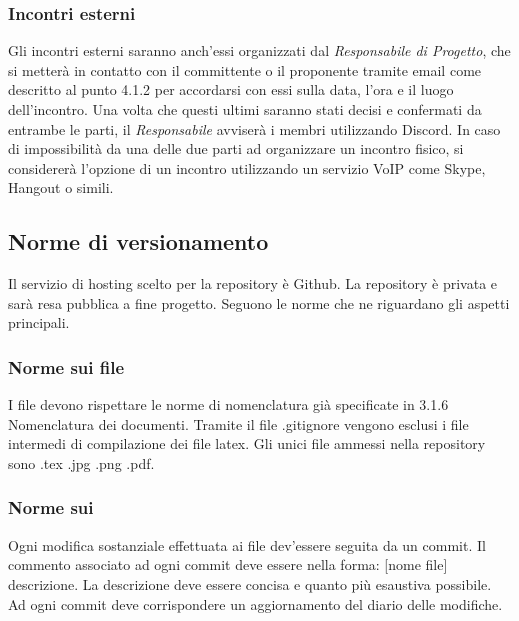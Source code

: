 \subsubsection{Incontri esterni}
Gli incontri esterni saranno anch'essi organizzati dal \emph{Responsabile di Progetto}, che si metterà in contatto con il committente o il proponente tramite email come descritto al punto 4.1.2 per accordarsi con essi sulla data, l'ora e il luogo dell'incontro. Una volta che questi ultimi saranno stati decisi e confermati da entrambe le parti, il \emph{Responsabile} avviserà i membri utilizzando Discord.
In caso di impossibilità da una delle due parti ad organizzare un incontro fisico, si considererà l'opzione di un incontro utilizzando un servizio VoIP come Skype, Hangout o simili.

\subsection{Norme di versionamento}
Il servizio di hosting scelto per la repository è Github. La repository è
privata e sarà resa pubblica a fine progetto. Seguono le norme che ne riguardano gli aspetti
principali.
\subsubsection{Norme sui file}
I file devono rispettare le norme di nomenclatura già specificate in 3.1.6 Nomenclatura dei documenti.
Tramite il file .gitignore vengono esclusi i file intermedi di compilazione dei file latex.
Gli unici file ammessi nella repository sono .tex .jpg .png .pdf.

\subsubsection{Norme sui }
Ogni modifica sostanziale effettuata ai file dev'essere seguita da un commit. Il commento associato ad ogni commit deve essere nella forma: [nome file] descrizione.
La descrizione deve essere concisa e quanto più esaustiva possibile. Ad ogni commit deve corrispondere un aggiornamento del diario delle modifiche.

